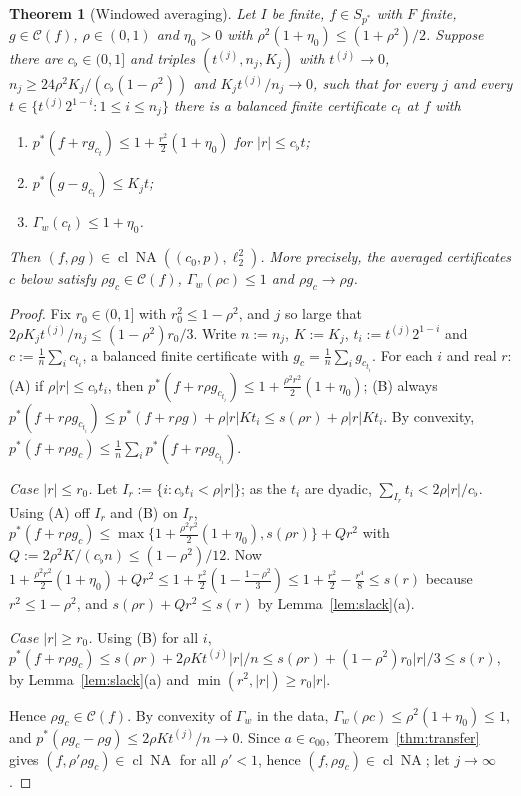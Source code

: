 \documentclass[10pt]{amsart}
\newtheorem{theorem}{Theorem}[section]
\theoremstyle{definition}
\theoremstyle{remark}
\newcommand{\NA}{\operatorname{NA}}
\newcommand{\Cset}{\mathcal C}
\newcommand{\cl}{\operatorname{cl}}
\begin{document}
\begin{theorem}[Windowed averaging]\label{thm:windowed}
Let $I$ be finite, $f\in S_{p^*}$ with $F$ finite, $g\in\Cset(f)$,
$\rho\in(0,1)$ and $\eta_0>0$ with $\rho^2(1+\eta_0)\le(1+\rho^2)/2$.
Suppose there are $c_{\flat}\in(0,1]$ and triples $(t^{(j)},n_j,K_j)$ with
$t^{(j)}\to0$, $n_j\ge24\rho^2K_j/(c_{\flat}(1-\rho^2))$ and
$K_jt^{(j)}/n_j\to0$, such that for every $j$ and every
$t\in\{t^{(j)}2^{1-i}:1\le i\le n_j\}$ there is a balanced finite
certificate $c_t$ at $f$ with
\begin{enumerate}
\item[(i)] $p^*(f+rg_{c_t})\le1+\frac{r^2}2(1+\eta_0)$ for $|r|\le c_{\flat}t$;
\item[(ii)] $p^*(g-g_{c_t})\le K_jt$;
\item[(iii)] $\Gamma_w(c_t)\le1+\eta_0$.
\end{enumerate}
Then $(f,\rho g)\in\cl\NA((c_0,p),\ell_2^2)$.  More precisely, the averaged
certificates $c$ below satisfy $\rho g_c\in\Cset(f)$, $\Gamma_w(\rho c)\le1$
and $\rho g_c\to\rho g$.
\end{theorem}

\begin{proof}
Fix $r_0\in(0,1]$ with $r_0^2\le1-\rho^2$, and $j$ so large that
$2\rho K_jt^{(j)}/n_j\le(1-\rho^2)r_0/3$.  Write $n:=n_j$, $K:=K_j$,
$t_i:=t^{(j)}2^{1-i}$ and $c:=\frac1n\sum_ic_{t_i}$, a balanced finite
certificate with $g_c=\frac1n\sum_ig_{c_{t_i}}$.  For each $i$ and real $r$:
(A) if $\rho|r|\le c_{\flat}t_i$, then $p^*(f+r\rho g_{c_{t_i}})\le1+
\frac{\rho^2r^2}2(1+\eta_0)$; (B) always $p^*(f+r\rho g_{c_{t_i}})\le
p^*(f+r\rho g)+\rho|r|Kt_i\le s(\rho r)+\rho|r|Kt_i$.  By convexity,
$p^*(f+r\rho g_c)\le\frac1n\sum_ip^*(f+r\rho g_{c_{t_i}})$.

\emph{Case $|r|\le r_0$.}  Let $I_r:=\{i:c_{\flat}t_i<\rho|r|\}$; as the $t_i$ are
dyadic, $\sum_{I_r}t_i<2\rho|r|/c_{\flat}$.  Using (A) off $I_r$ and (B) on $I_r$,
$p^*(f+r\rho g_c)\le\max\{1+\frac{\rho^2r^2}2(1+\eta_0),s(\rho r)\}+Qr^2$
with $Q:=2\rho^2K/(c_{\flat}n)\le(1-\rho^2)/12$.  Now
$1+\frac{\rho^2r^2}2(1+\eta_0)+Qr^2\le1+\frac{r^2}2(1-\frac{1-\rho^2}3)\le
1+\frac{r^2}2-\frac{r^4}8\le s(r)$ because $r^2\le1-\rho^2$, and
$s(\rho r)+Qr^2\le s(r)$ by Lemma~\ref{lem:slack}(a).

\emph{Case $|r|\ge r_0$.}  Using (B) for all $i$, $p^*(f+r\rho g_c)\le
s(\rho r)+2\rho Kt^{(j)}|r|/n\le s(\rho r)+(1-\rho^2)r_0|r|/3\le s(r)$, by
Lemma~\ref{lem:slack}(a) and $\min(r^2,|r|)\ge r_0|r|$.

Hence $\rho g_c\in\Cset(f)$.  By convexity of $\Gamma_w$ in the data,
$\Gamma_w(\rho c)\le\rho^2(1+\eta_0)\le1$, and $p^*(\rho g_c-\rho g)\le
2\rho Kt^{(j)}/n\to0$.  Since $a\in c_{00}$, Theorem~\ref{thm:transfer}
gives $(f,\rho'\rho g_c)\in\cl\NA$ for all $\rho'<1$, hence
$(f,\rho g_c)\in\cl\NA$; let $j\to\infty$.
\end{proof}
\end{document}
